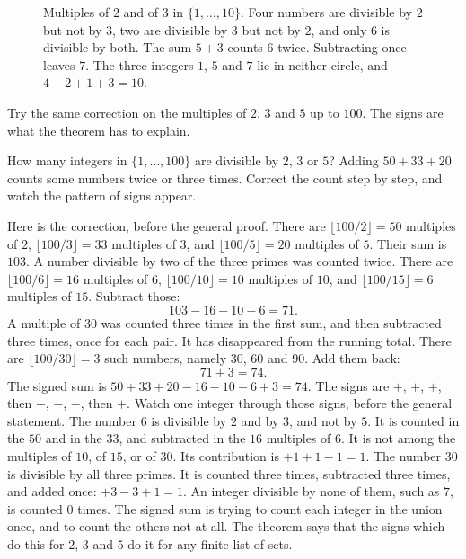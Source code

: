 \begin{figure}[ht]
\centering
{}
\caption{Multiples of $2$ and of $3$ in $\{1,\dots,10\}$. Four numbers are divisible by $2$ but not by $3$, two are divisible by $3$ but not by $2$, and only $6$ is divisible by both. The sum $5+3$ counts $6$ twice. Subtracting once leaves $7$. The three integers $1$, $5$ and $7$ lie in neither circle, and $4+2+1+3=10$.}
\label{fig:twosets}
\end{figure}

Try the same correction on the multiples of $2$, $3$ and $5$ up to $100$. The signs are what the theorem has to explain.

\begin{think}
How many integers in $\{1,\dots,100\}$ are divisible by $2$, $3$ or $5$? Adding $50+33+20$ counts some numbers twice or three times. Correct the count step by step, and watch the pattern of signs appear.
\end{think}

Here is the correction, before the general proof. There are $\lfloor 100/2\rfloor=50$ multiples of $2$, $\lfloor 100/3\rfloor=33$ multiples of $3$, and $\lfloor 100/5\rfloor=20$ multiples of $5$. Their sum is $103$. A number divisible by two of the three primes was counted twice. There are $\lfloor 100/6\rfloor=16$ multiples of $6$, $\lfloor 100/10\rfloor=10$ multiples of $10$, and $\lfloor 100/15\rfloor=6$ multiples of $15$. Subtract those:
\[
103-16-10-6=71.
\]
A multiple of $30$ was counted three times in the first sum, and then subtracted three times, once for each pair. It has disappeared from the running total. There are $\lfloor 100/30\rfloor=3$ such numbers, namely $30$, $60$ and $90$. Add them back:
\[
71+3=74.
\]
The signed sum is $50+33+20-16-10-6+3=74$. The signs are $+$, $+$, $+$, then $-$, $-$, $-$, then $+$. Watch one integer through those signs, before the general statement. The number $6$ is divisible by $2$ and by $3$, and not by $5$. It is counted in the $50$ and in the $33$, and subtracted in the $16$ multiples of $6$. It is not among the multiples of $10$, of $15$, or of $30$. Its contribution is $+1+1-1=1$. The number $30$ is divisible by all three primes. It is counted three times, subtracted three times, and added once: $+3-3+1=1$. An integer divisible by none of them, such as $7$, is counted $0$ times. The signed sum is trying to count each integer in the union once, and to count the others not at all. The theorem says that the signs which do this for $2$, $3$ and $5$ do it for any finite list of sets.

